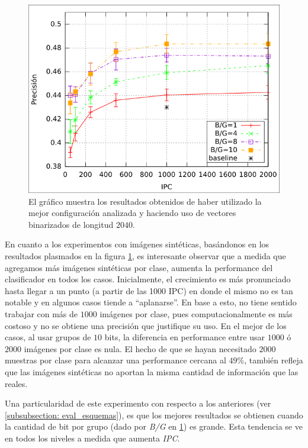 			\begin{figure}[htbp]
				\centering
				\centerline{
					\includegraphics[scale=0.5]{img/resultados/sinteticas/mean_2040.png}
				}
				\caption[Sintéticas media 2040]{El gráfico muestra los resultados obtenidos de haber utilizado la mejor configuración analizada y haciendo uso de vectores binarizados de longitud $2040$.}
				\label{fig: Sinteticas-media-2040}
			\end{figure}

	En cuanto a los experimentos con imágenes sintéticas, basándonos en los resultados plasmados en la figura \ref{fig: Sinteticas-media-2040}, es interesante observar que a medida que agregamos más imágenes sintéticas por clase, aumenta la performance del clasificador en todos los casos. Inicialmente, el crecimiento es más pronunciado hasta llegar a un punto (a partir de las 1000 IPC) en donde el mismo no es tan notable y en algunos casos tiende a ``aplanarse''. En base a esto, no tiene sentido trabajar con más de $1000$ imágenes por clase, pues computacionalmente es más costoso y no se obtiene una precisión que justifique su uso. En el mejor de los casos, al usar grupos de $10$ bits, la diferencia en performance entre usar $1000$ ó $2000$ imágenes por clase es nula. El hecho de que se hayan necesitado $2000$ muestras por clase para alcanzar una performance cercana al $49\%$, también refleja que las imágenes sintéticas no aportan la misma cantidad de información que las reales.
	
	Una particularidad de este experimento con respecto a los anteriores (ver \ref{subsubsection: eval_esquemas}), es que los mejores resultados se obtienen cuando la cantidad de bit por grupo (dado por \textit{B/G} en \ref{fig: Sinteticas-media-2040}) es grande. Esta tendencia se ve en todos los niveles a medida que aumenta \textit{IPC}.

